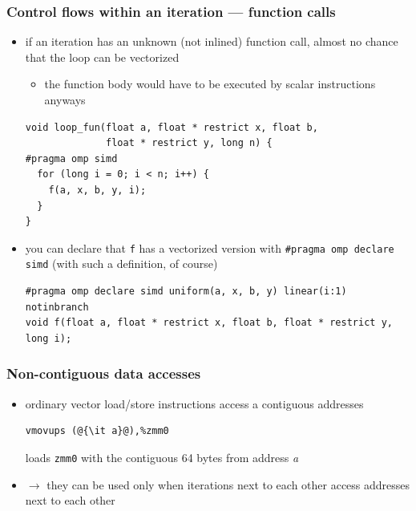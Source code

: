 \documentclass[12pt,dvipdfmx]{beamer}
\begin{document}
\begin{frame}[fragile]
  \frametitle{Control flows within an iteration --- function calls}
  \begin{itemize}
  \item if an iteration has an unknown (not inlined) function call,
    almost no chance that the loop can be vectorized
    \begin{itemize}
    \item the function body would have to be executed
      by scalar instructions anyways
    \end{itemize}
    
\begin{lstlisting}
void loop_fun(float a, float * restrict x, float b,
              float * restrict y, long n) {
#pragma omp simd
  for (long i = 0; i < n; i++) {
    f(a, x, b, y, i);
  }
}
\end{lstlisting}

\item you can declare that {\tt f} has a vectorized version
  with {\tt \#pragma omp declare simd} (with such a definition, of course)

\begin{lstlisting}
#pragma omp declare simd uniform(a, x, b, y) linear(i:1) notinbranch
void f(float a, float * restrict x, float b, float * restrict y, long i);
\end{lstlisting}
  \end{itemize}
\end{frame}

\begin{frame}[fragile]
  \frametitle{Non-contiguous data accesses}
  \begin{itemize}
  \item ordinary vector load/store instructions
    access a contiguous addresses
\begin{lstlisting}
vmovups (@{\it a}@),%zmm0
\end{lstlisting}
    loads {\tt zmm0} with the contiguous 64 bytes from address {\it a}
  \item $\rightarrow$ they can be used only when
    iterations next to each other
    access addresses next to each other
  \end{itemize}
\end{frame}
\end{document}
